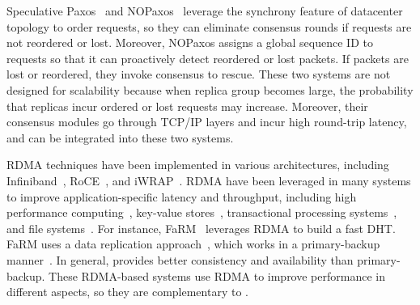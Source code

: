 Speculative Paxos~\cite{specpaxos:nsdi15} and NOPaxos~\cite{nopaxos:osdi16} 
leverage the synchrony feature of datacenter topology to order requests, so 
they can eliminate consensus rounds if requests are not reordered or lost. 
Moreover, NOPaxos assigns a global sequence ID to requests so that it can 
proactively detect reordered or lost packets. If packets are lost or 
reordered, they invoke consensus to rescue. These two systems are not designed 
for scalability because when replica group becomes large, the probability that 
replicas incur ordered or lost requests may increase. Moreover, their consensus 
modules go through TCP/IP layers and incur high round-trip latency, 
and \xxx can be integrated into these two systems.

 RDMA techniques have been implemented in various 
architectures, including Infiniband~\cite{infiniband}, RoCE~\cite{roce}, and 
iWRAP~\cite{iwrap}. RDMA have been leveraged in many systems to improve 
application-specific latency and throughput, including high performance 
computing~\cite{openmpi}, key-value 
stores~\cite{pilaf:usenix14,herd:sigcomm14,farm:nsdi14,memcached:rdma}, 
transactional processing systems~\cite{drtm:sosp15,farm:sosp15}, and file 
systems~\cite{gibson:nfs}. For instance, FaRM~\cite{farm:nsdi14} leverages RDMA 
to build a fast DHT. FaRM uses a data replication 
approach~\cite{ramcloud:sosp11}, which works in a primary-backup 
manner~\cite{remus:nsdi08}. In general, \paxos provides better consistency and 
availability than primary-backup. These RDMA-based systems use RDMA to improve 
performance in different aspects, so they are complementary to \xxx.




